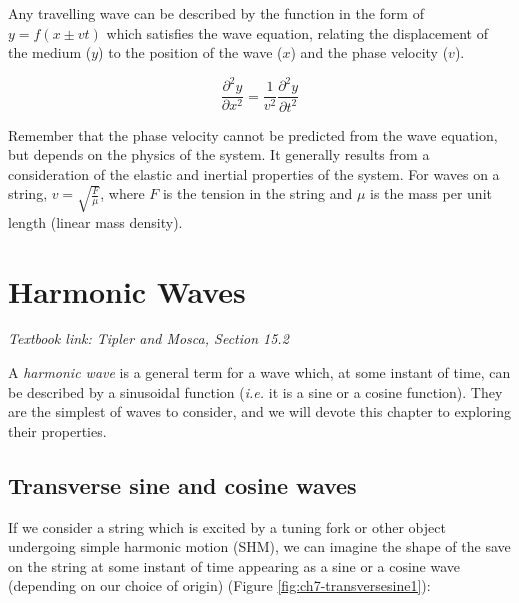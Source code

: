 \documentclass[
]{book}
\begin{document}
Any travelling wave can be described by the function in the form of \(y = f(x \pm vt)\) which satisfies the wave equation, relating the displacement of the medium (\(y\)) to the position of the wave (\(x\)) and the phase velocity (\(v\)).

\begin{equation}
\frac{\partial^2 y}{\partial x^2} = \frac{1}{v^2} \frac{\partial^2 y}{\partial t^2}
\end{equation}

Remember that the phase velocity cannot be predicted from the wave equation, but depends on the physics of the system. It generally results from a consideration of the elastic and inertial properties of the system. For waves on a string, \(v = \sqrt{\frac{F}{\mu}}\), where \(F\) is the tension in the string and \(\mu\) is the mass per unit length (linear mass density).

\hypertarget{sec:ch7-harmonicwaves}{%
\chapter{Harmonic Waves}\label{sec:ch7-harmonicwaves}}

\emph{Textbook link: Tipler and Mosca, Section 15.2}

A \emph{harmonic wave} is a general term for a wave which, at some instant of time, can be described by a sinusoidal function (\emph{i.e.} it is a sine or a cosine function). They are the simplest of waves to consider, and we will devote this chapter to exploring their properties.

\hypertarget{sec:ch7-sinecosine}{%
\section{Transverse sine and cosine waves}\label{sec:ch7-sinecosine}}

If we consider a string which is excited by a tuning fork or other object undergoing simple harmonic motion (SHM), we can imagine the shape of the save on the string at some instant of time appearing as a sine or a cosine wave (depending on our choice of origin) (Figure \ref{fig:ch7-transversesine1}):
\end{document}

